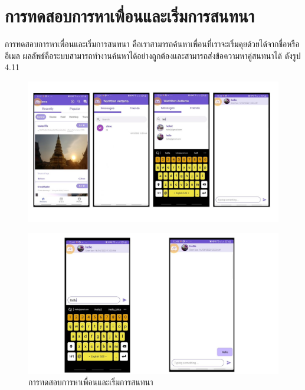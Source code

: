 \section{การทดสอบการหาเพื่อนและเริ่มการสนทนา}
การทดสอบการหาเพื่อนและเริ่มการสนทนา คือเราสามารถค้นหาเพื่อนที่เราจะเริ่มคุยด้วยได้จากชื่อหรืออีเมล
ผลลัพธ์คือระบบสามารถทำงานค้นหาได้อย่างถูกต้องและสามารถส่งข้อความหาคู่สนทนาได้  ดังรูป 4.11

\begin{figure}
    \begin{center}
      \includegraphics[width=1\textwidth]{./image/testing/Slide12.JPG}
    \end{center}
    \end{figure}

\begin{figure}
    \begin{center}
      \includegraphics[width=1\textwidth]{./image/testing/Slide13.JPG}
    \end{center}
    \caption[การทดสอบการหาเพื่อนและเริ่มการสนทนา]{การทดสอบการหาเพื่อนและเริ่มการสนทนา}
    \end{figure}